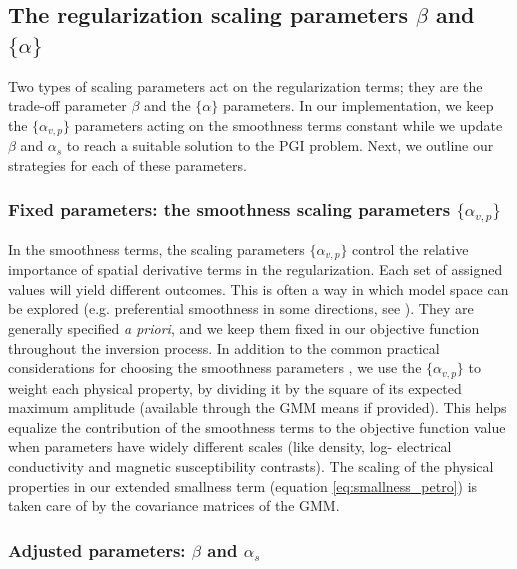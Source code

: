 \documentclass[extra, mreferee]{gji_joint} %
\begin{document}
\subsection{The regularization scaling parameters $\beta$ and $\{\alpha\}$}

Two types of scaling parameters act on the regularization terms; they are the trade-off parameter $\beta$ and the $\{\alpha\}$ parameters. In our implementation, we keep the $\{\alpha_{v,p}\}$ parameters acting on the smoothness terms constant while we update $\beta$ and $\alpha_s$ to reach a suitable solution to the PGI problem. Next, we outline our strategies for each of these parameters.

\subsubsection{Fixed parameters: the smoothness scaling parameters $\{\alpha_{v, p}\}$}

In the smoothness terms, the scaling parameters $\{\alpha_{v, p}\}$ control the relative importance of spatial derivative terms in the regularization. Each set of assigned values will yield different outcomes. This is often a way in which model space can be explored (e.g. preferential smoothness in some directions, see \citet{Williams_2008, Lelievre2009}). They are generally specified \textit{a priori}, and we keep them fixed in our objective function throughout the inversion process. In addition to the common practical considerations for choosing the smoothness parameters \citep{Tutorial,williams2006applying}, we use the $\{\alpha_{v, p}\}$ to weight each physical property, by dividing it by the square of its expected maximum amplitude (available through the GMM means if provided). This helps equalize the contribution of the smoothness terms to the objective function value when parameters have widely different scales (like density, log- electrical conductivity and magnetic susceptibility contrasts). The scaling of the physical properties in our extended smallness term (equation \eqref{eq:smallness_petro}) is taken care of by the covariance matrices of the GMM.

\subsubsection{Adjusted parameters: $\beta$ and $\alpha_s$}
\end{document}
